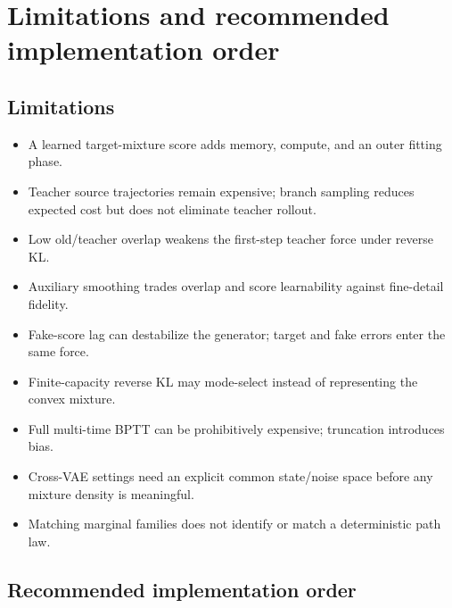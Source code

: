 \documentclass[11pt,a4paper]{article}
\theoremstyle{plain}
\theoremstyle{definition}
\begin{document}
\section{Limitations and recommended implementation order}
\label{sec:limitations}

\subsection{Limitations}

\begin{itemize}[leftmargin=1.5em]
\item A learned target-mixture score adds memory, compute, and an outer fitting phase.
\item Teacher source trajectories remain expensive; branch sampling reduces expected cost but
      does not eliminate teacher rollout.
\item Low old/teacher overlap weakens the first-step teacher force under reverse KL.
\item Auxiliary smoothing trades overlap and score learnability against fine-detail fidelity.
\item Fake-score lag can destabilize the generator; target and fake errors enter the same force.
\item Finite-capacity reverse KL may mode-select instead of representing the convex mixture.
\item Full multi-time BPTT can be prohibitively expensive; truncation introduces bias.
\item Cross-VAE settings need an explicit common state/noise space before any mixture density is
      meaningful.
\item Matching marginal families does not identify or match a deterministic path law.
\end{itemize}

\subsection{Recommended implementation order}
\end{document}
